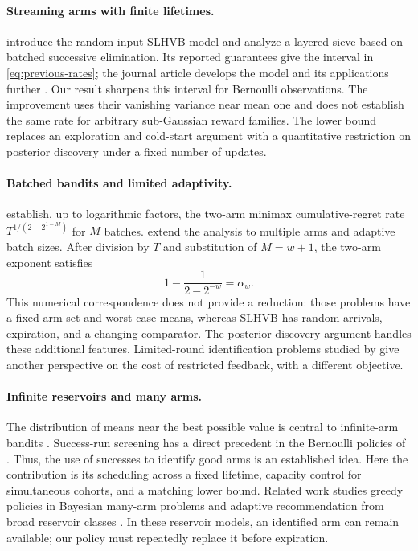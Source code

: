 \documentclass[11pt,letterpaper]{article}
\numberwithin{equation}{section}
\theoremstyle{definition}
\theoremstyle{remark}
\newcommand{\1}{\mathbf{1}}
\begin{document}
\paragraph{Streaming arms with finite lifetimes.}
\citet{jia2023short} introduce the random-input SLHVB model and analyze a
layered sieve based on batched successive elimination. Its reported
guarantees give the interval in \cref{eq:previous-rates}; the journal
article develops the model and its applications further
\citep{jia2026short}. Our result sharpens this interval for Bernoulli
observations. The improvement uses their vanishing variance near mean one
and does not establish the same rate for arbitrary sub-Gaussian reward
families. The lower bound replaces an exploration and cold-start argument
with a quantitative restriction on posterior discovery under a fixed
number of updates.

\paragraph{Batched bandits and limited adaptivity.}
\citet{perchet2016batched} establish, up to logarithmic factors, the
two-arm minimax cumulative-regret rate
$T^{1/(2-2^{1-M})}$ for $M$ batches.
\citet{gao2019batched} extend the analysis to multiple arms and
adaptive batch sizes. After division by $T$ and substitution of
$M=w+1$, the two-arm exponent satisfies
\begin{equation}\label{eq:batch-identity}
  1-\frac{1}{2-2^{-w}}=\alpha_w.
\end{equation}
This numerical correspondence does not provide a reduction: those
problems have a fixed arm set and worst-case means, whereas SLHVB has
random arrivals, expiration, and a changing comparator.
The posterior-discovery argument handles these additional features.
Limited-round identification problems studied by
\citet{agarwal2017limited} give another perspective on the cost of
restricted feedback, with a different objective.

\paragraph{Infinite reservoirs and many arms.}
The distribution of means near the best possible value is central to
infinite-arm bandits \citep{berry1997infinite,wang2008infinite}.
Success-run screening has a direct precedent in the Bernoulli policies
of \citet{bonald2013two}. Thus, the use of successes to identify good arms
is an established idea. Here the contribution is its scheduling across
a fixed lifetime, capacity control for simultaneous cohorts, and a
matching lower bound. Related work studies greedy policies in Bayesian
many-arm problems \citep{bayati2020greedy} and adaptive recommendation
from broad reservoir classes \citep{pilliat2026adaptive}.
In these reservoir models, an identified arm can remain available;
our policy must repeatedly replace it before expiration.
\end{document}
